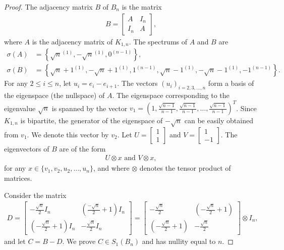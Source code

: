 \documentclass[3p,times,12pt]{article}
\begin{document}
\begin{proof}
		The adjacency matrix $B$ of $B_n$ is the matrix
		\begin{align*}
			B =\begin{bmatrix}
				A & I_n\\
				I_n & A
			\end{bmatrix},
		\end{align*}
		where $A$ is the adjacency matrix of $K_{1,n}$. The spectrums of $A$ and $B$ are 
		\begin{align*}
			\sigma(A) &= \left\{ \sqrt{n}^{(1)},-\sqrt{n}^{(1)},0^{(n-1)} \right\},\\
			\sigma(B) &= \left\{ \sqrt{n}+1^{(1)}, - \sqrt{n}+1^{(1)}, 1^{(n-1)}, \sqrt{n}-1^{(1)}, -\sqrt{n}-1^{(1)}, -1^{(n-1)} \right\}. 
		\end{align*}
		For any $2\leq i \leq n$, let $u_i = e_i-e_{i+1}$. The vectors $(u_i)_{i = 2,3,\ldots,n}$ form a basis of the eigenspace (the nullspace) of $A$. The eigenspace corresponding to the eigenvalue $\sqrt{n}$ is spanned by the vector $v_1 = \left( 1, \frac{\sqrt{n-1}}{n-1}, \frac{\sqrt{n-1}}{n-1},\ldots, \frac{\sqrt{n-1}}{n-1} \right)^T$. Since $K_{1,n}$ is bipartite, the generator of the eigenspace of $-\sqrt{n}$ can be easily obtained from $v_1$. We denote this vector by $v_2$. Let $U = \begin{bmatrix}
		1 \\
		1
		\end{bmatrix}$ and $V = \begin{bmatrix}
		1\\
		-1
		\end{bmatrix}$. The eigenvectors of $B$ are of the form
		\begin{align*}
			U
			\otimes 
			x \mbox{ and }
			V
			\otimes 
			x,
		\end{align*}
		for any $x\in \{v_1,v_2,u_2,\ldots,u_n\}$, and where $\otimes$ denotes the tensor product of matrices.
		
		Consider the matrix 
		\begin{align*}
			D = 
			\begin{bmatrix}
				-\frac{\sqrt{n}}{2} I_n & \left( \frac{-\sqrt{n}}{2} +1\right) I_n\\
				\left( -\frac{\sqrt{n}}{2} +1\right) I_n & -\frac{\sqrt{n}}{2} I_n
			\end{bmatrix} = 
			\begin{bmatrix}
			-\frac{\sqrt{n}}{2}  & \left( -\frac{\sqrt{n}}{2} +1\right) \\
			\left( -\frac{\sqrt{n}}{2} +1\right) & -\frac{\sqrt{n}}{2}
			\end{bmatrix} \otimes I_n,
		\end{align*}
		 and let $C = B - D$.	We prove $C\in S_1(B_n)$ and has nullity equal to $n$. 
		 

\end{proof}
\end{document}
